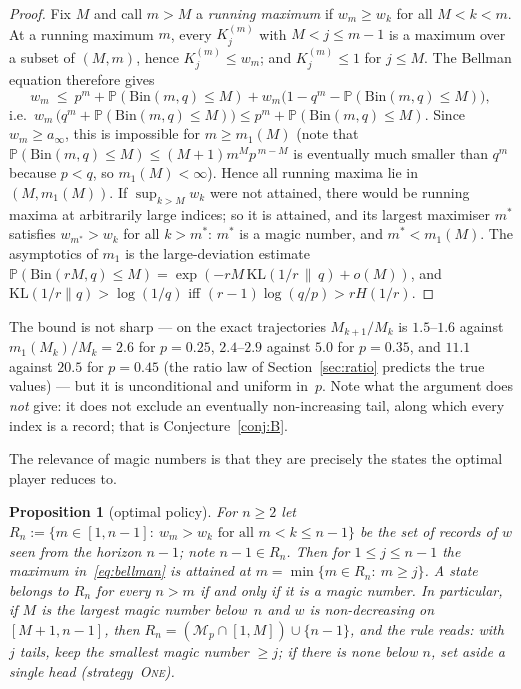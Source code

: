 \documentclass[11pt]{article}
\newtheorem{proposition}[theorem]{Proposition}
\theoremstyle{definition}
\newcommand{\One}{\textsc{One}}
\newcommand{\Bin}{\mathrm{Bin}}
\newcommand{\Prob}{\mathbb{P}}
\begin{document}
\begin{proof}
  Fix $M$ and call $m>M$ a \emph{running maximum} if $w_m\ge w_k$ for
  all $M<k<m$.  At a running maximum $m$, every $K^{(m)}_j$ with
  $M<j\le m-1$ is a maximum over a subset of $(M,m)$, hence
  $K^{(m)}_j\le w_m$; and $K^{(m)}_j\le1$ for $j\le M$.  The Bellman
  equation therefore gives
  \[
    w_m\ \le\ p^{m}+\Prob(\Bin(m,q)\le M)+w_m\bigl(1-q^{m}-\Prob(\Bin(m,q)\le M)\bigr),
  \]
  i.e.\ $w_m\,\bigl(q^{m}+\Prob(\Bin(m,q)\le M)\bigr)\le p^{m}+\Prob(\Bin(m,q)\le M)$.
  Since $w_m\ge a_\infty$, this is impossible for $m\ge m_1(M)$
  (note that $\Prob(\Bin(m,q)\le M)\le(M+1)m^{M}p^{\,m-M}$ is
  eventually much smaller than $q^{m}$ because $p<q$, so $m_1(M)<\infty$).
  Hence all running maxima lie in $(M,m_1(M))$.  If $\sup_{k>M}w_k$
  were not attained, there would be running maxima at arbitrarily
  large indices; so it is attained, and its largest maximiser $m^*$
  satisfies $w_{m^*}>w_k$ for all $k>m^*$: $m^*$ is a magic number,
  and $m^*<m_1(M)$.  The asymptotics of $m_1$ is the large-deviation
  estimate $\Prob(\Bin(rM,q)\le M)=\exp(-rM\,\mathrm{KL}(1/r\,\|\,q)+o(M))$,
  and $\mathrm{KL}(1/r\|q)>\log(1/q)$ iff $(r-1)\log(q/p)>rH(1/r)$.
\end{proof}

The bound is not sharp --- on the exact trajectories
$M_{k+1}/M_k$ is $1.5$--$1.6$ against $m_1(M_k)/M_k=2.6$ for $p=0.25$,
$2.4$--$2.9$ against $5.0$ for $p=0.35$, and $11.1$ against $20.5$ for
$p=0.45$ (the ratio law of Section~\ref{sec:ratio} predicts the true
values) --- but it is unconditional and uniform in~$p$.  Note what the
argument does \emph{not} give: it does not exclude an eventually
non-increasing tail, along which every index is a record; that is
Conjecture~\ref{conj:B}.

The relevance of magic numbers is that they are precisely the states
the optimal player reduces to.

\begin{proposition}[optimal policy]\label{prop:policy}
  For $n\ge2$ let
  $R_n:=\{m\in[1,n-1]:\ w_m>w_k\text{ for all }m<k\le n-1\}$ be the
  set of records of $w$ seen from the horizon $n-1$; note $n-1\in R_n$.
  Then for $1\le j\le n-1$ the maximum in~\eqref{eq:bellman} is attained
  at $m=\min\{m\in R_n:\ m\ge j\}$.  A state belongs to $R_n$ for every
  $n>m$ if and only if it is a magic number.  In particular, if $M$ is
  the largest magic number below~$n$ and $w$ is non-decreasing on
  $[M+1,n-1]$, then $R_n=(\mathcal M_p\cap[1,M])\cup\{n-1\}$, and the
  rule reads: \emph{with $j$ tails, keep the smallest magic number
  $\ge j$; if there is none below $n$, set aside a single head
  (strategy~\One)}.
\end{proposition}
\end{document}
